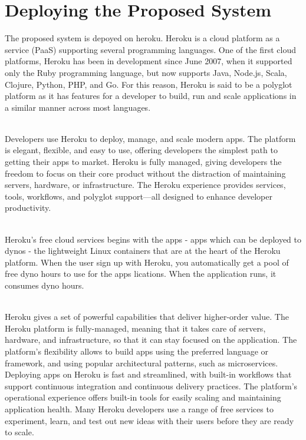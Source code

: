 \documentclass[12pt,a4paper]{report}
\begin{document}
\section{Deploying the Proposed System}
\hspace{0.25cm}
\par
The proposed system is depoyed on heroku. Heroku is a cloud platform as a service (PaaS) supporting several programming languages. One of the first cloud platforms, Heroku has been in development since June 2007, when it supported only the Ruby programming language, but now supports Java, Node.js, Scala, Clojure, Python, PHP, and Go. For this reason, Heroku is said to be a polyglot platform as it has features for a developer to build, run and scale applications in a similar manner across most languages.
\\
\\
\par
Developers use Heroku to deploy, manage, and scale modern apps. The platform is elegant, flexible, and easy to use, offering developers the simplest path to getting their apps to market. Heroku is fully managed, giving developers the freedom to focus on their core product without the distraction of maintaining servers, hardware, or infrastructure. The Heroku experience provides services, tools, workflows, and polyglot support—all designed to enhance developer productivity.
\\
\\
\par
Heroku's free cloud services begins with the apps - apps which can be deployed to dynos - the lightweight Linux containers that are at the heart of the Heroku platform. When the user sign up with Heroku, you automatically get a pool of free dyno hours to use for the apps
lications. When the application runs, it consumes dyno hours.
\\
\\
\par
Heroku gives a set of powerful capabilities that deliver higher-order value. The Heroku platform is fully-managed, meaning that it takes care of servers, hardware, and infrastructure, so that it can stay focused on the application. The platform’s flexibility allows to build apps using the preferred language or framework, and using popular architectural patterns, such as microservices.
Deploying apps on Heroku is fast and streamlined, with built-in workflows that support continuous integration and continuous delivery practices. The platform’s operational experience offers built-in tools for easily scaling and maintaining application health. Many Heroku developers use a range of free services to experiment, learn, and test out new ideas with their users before they are ready to scale.
\end{document}
